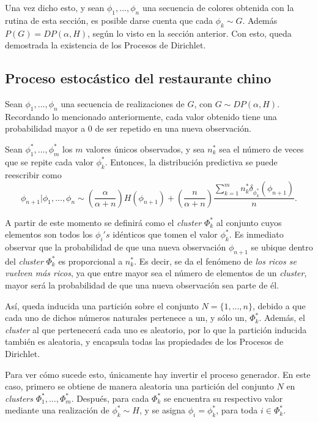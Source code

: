 Una vez dicho esto, y sean $\phi_1,...,\phi_n$ una secuencia de colores obtenida con la rutina de esta secci\'on, es posible darse cuenta que cada $\phi_k \sim G$. Adem\'as $P(G) = DP(\alpha,H)$, seg\'un lo visto en la secci\'on anterior. Con esto, queda demostrada la existencia de los Procesos de Dirichlet.

\subsection{Proceso estoc\'astico del restaurante chino}

Sean $\phi_1,...,\phi_n$ una secuencia de realizaciones de $G$, con $G \sim DP(\alpha,H)$. Recordando lo mencionado anteriormente, cada valor obtenido tiene una probabilidad mayor a $0$ de ser repetido en una nueva observaci\'on. 

Sean $\phi_1^*,...,\phi_m^*$ los $m$ valores \'unicos observados, y sea $n_k^*$ sea el n\'umero de veces que se repite cada valor $\phi_k^*$. Entonces, la distribuci\'on predictiva se puede reescribir como
\begin{equation*}
    \phi_{n+1}|\phi_1,...,\phi_n \sim 
    \left(\frac{\alpha}{\alpha + n}\right)H(\phi_{n+1}) + 
    \left(\frac{n}{\alpha + n}\right)\frac{\sum_{k=1}^m n_k^*\delta_{\phi_k^*}(\phi_{n+1})}{n}.
\end{equation*}

A partir de este momento se definir\'a como el \textit{cluster} $\Phi_k^*$ al conjunto cuyos elementos son todos los $\phi_i 's$ id\'enticos que tomen el valor $\phi_k^*$. Es inmediato observar que la probabilidad de que una nueva observaci\'on $\phi_{n+1}$ se ubique dentro del \textit{cluster} $\Phi_k^*$ es proporcional a $n_k^*$. Es decir, se da el fen\'omeno de \textit{los ricos se vuelven m\'as ricos}, ya que entre mayor sea el n\'umero de elementos de un \textit{cluster}, mayor ser\'a la probabilidad de que una nueva observaci\'on sea parte de \'el.

As\'i, queda inducida una partici\'on sobre el conjunto $N = \{1,...,n\}$, debido a que cada uno de dichos n\'umeros naturales pertenece a un, y s\'olo un, $\Phi_k^*$. Adem\'as, el \textit{cluster} al que pertenecer\'a cada uno es aleatorio, por lo que la partici\'on inducida tambi\'en es aleatoria, y encapsula todas las propiedades de los Procesos de Dirichlet.

Para ver c\'omo sucede esto, \'unicamente hay invertir el proceso generador. En este caso, primero se obtiene de manera aleatoria una partici\'on del conjunto $N$ en \textit{clusters} $\Phi_1^*,...,\Phi_m^*$. Despu\'es, para cada $\Phi_k^*$ se encuentra su respectivo valor mediante una realizaci\'on de $\phi_k^* \sim H$, y se asigna $\phi_i = \phi_k^*$, para toda $i \in \Phi_k^*$.

